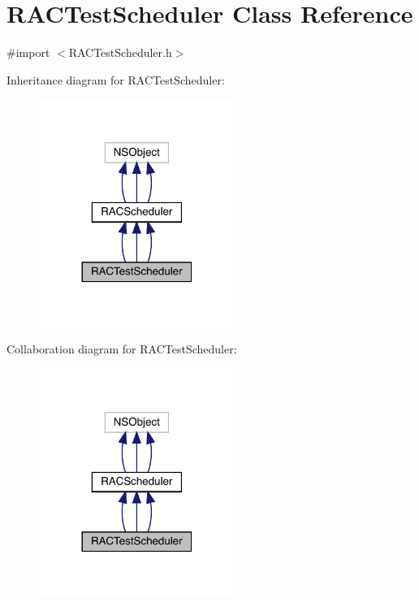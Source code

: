 \hypertarget{interface_r_a_c_test_scheduler}{}\section{R\+A\+C\+Test\+Scheduler Class Reference}
\label{interface_r_a_c_test_scheduler}


{\ttfamily \#import $<$R\+A\+C\+Test\+Scheduler.\+h$>$}



Inheritance diagram for R\+A\+C\+Test\+Scheduler\+:\nopagebreak
\begin{figure}[H]
\begin{center}
\leavevmode
\includegraphics[width=180pt]{interface_r_a_c_test_scheduler__inherit__graph}
\end{center}
\end{figure}


Collaboration diagram for R\+A\+C\+Test\+Scheduler\+:\nopagebreak
\begin{figure}[H]
\begin{center}
\leavevmode
\includegraphics[width=180pt]{interface_r_a_c_test_scheduler__coll__graph}
\end{center}
\end{figure}
